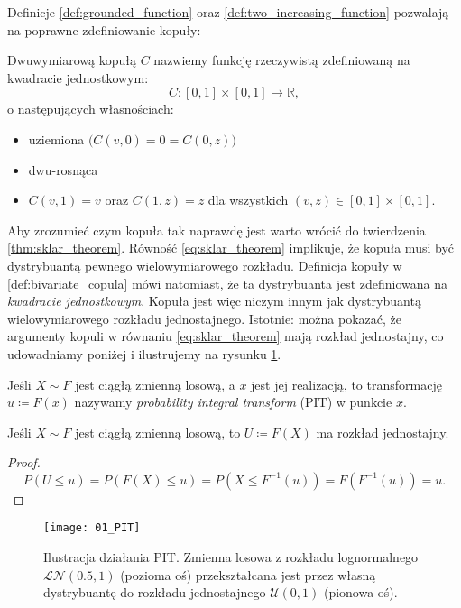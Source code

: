 Definicje \ref{def:grounded_function} oraz \ref{def:two_increasing_function} pozwalają na poprawne zdefiniowanie kopuły:
\begin{df}
	Dwuwymiarową kopułą $C$ nazwiemy funkcję rzeczywistą zdefiniowaną na kwadracie jednostkowym:
	$$ C\colon [0, 1]\times[0, 1] \mapsto \mathbb{R},$$ o następujących własnościach:
	\begin{itemize}
		\item uziemiona $\big(C(v, 0) = 0 = C(0, z)\big)$
		\item dwu-rosnąca
		\item $C(v, 1) = v$ oraz $C(1, z) = z$ dla wszystkich $(v, z)\in [0,1]\times [0, 1].$
	\end{itemize}
	\label{def:bivariate_copula}
\end{df}

Aby zrozumieć czym kopuła tak naprawdę jest warto wrócić do twierdzenia \ref{thm:sklar_theorem}. Równość \ref{eq:sklar_theorem} implikuje, że kopuła musi być dystrybuantą pewnego wielowymiarowego rozkładu. Definicja kopuły w \ref{def:bivariate_copula} mówi natomiast, że ta dystrybuanta jest zdefiniowana na \emph{kwadracie jednostkowym}. Kopuła jest więc niczym innym jak dystrybuantą wielowymiarowego rozkładu jednostajnego. Istotnie: można pokazać, że argumenty kopuli w równaniu \ref{eq:sklar_theorem} mają rozkład jednostajny, co udowadniamy poniżej i ilustrujemy na rysunku \ref{fig:PIT}.

\begin{df}
	Jeśli $X\sim F$ jest ciągłą zmienną losową, a $x$ jest jej realizacją, to transformację $u\coloneqq F(x)$ nazywamy \emph{probability integral transform} (PIT) w punkcie $x$.
	\label{def:PIT}
\end{df}
\begin{thm}
	Jeśli $X\sim F$ jest ciągłą zmienną losową, to $U\coloneqq F(X)$ ma rozkład jednostajny.
\end{thm}
\begin{proof}
	$$P(U\leqslant u) = P(F(X) \leqslant u) = P(X\leqslant F^{-1}(u))=F(F^{-1}(u))=u.$$
\end{proof}

\begin{figure}[H]
	\centering
	\texttt{[image: 01\_PIT]}	
	\caption{Ilustracja działania PIT. Zmienna losowa z rozkładu lognormalnego $
		\mathcal{LN}(0.5, 1)$ (pozioma oś) przekształcana jest przez własną dystrybuantę do rozkładu jednostajnego $\mathcal{U}(0, 1)$ (pionowa oś).\label{fig:PIT}}
\end{figure}

